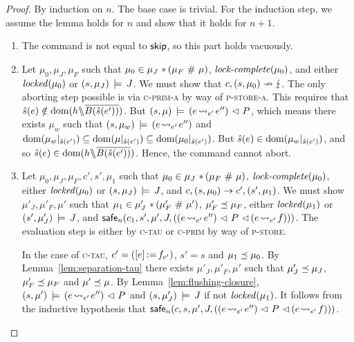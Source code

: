 \documentclass[11pt]{report}
\begin{document}
\begin{proof}
    By induction on $n$. The base case is trivial. For the induction step, we assume the lemma holds for $n$ and show that it holds for $n+1$.

    \begin{enumerate}
        \item The command is not equal to $\operatorname{\mathsf{skip}}$, so this part holds vacuously. 

        \item Let $\mu_0,\mu_J,\mu_F$ such that $\mu_0 \in \mu_J \operatorname{\,\ast\,} (\mu_F \operatorname{\,\#\,} \mu)$, $\text{\textit{lock-complete}}(\mu_0)$, and either $\mathit{locked}(\mu_0)$ or $(s,\mu_J) \,\models\, J$. We must show that $c,(s,\mu_0) \nrightarrow \lightning$. The only aborting step possible is via \textsc{c-prim-a} by way of \textsc{p-store-a}. This requires that $\hat{s}(e) \notin \operatorname{\mathrm{dom}}(h \backslash\!\!\backslash \overline{B(\hat{s}(e'))})$. But $(s,\mu) \,\models\, (e \!\leadsto_{e'}\! e'') \operatorname{\,\vartriangleleft\,} P$, which means there exists $\mu_w$ such that $(s,\mu_w) \,\models\, (e \!\leadsto_{e'}\! e'')$ and $\operatorname{\mathrm{dom}}(\mu_w |_{\hat{s}(e')}) \subseteq \operatorname{\mathrm{dom}}(\mu |_{\hat{s}(e')}) \subseteq \operatorname{\mathrm{dom}}(\mu_0 |_{\hat{s}(e')})$. But $\hat{s}(e) \in \operatorname{\mathrm{dom}}(\mu_w |_{\hat{s}(e')})$, and so $\hat{s}(e) \in \operatorname{\mathrm{dom}}(h \backslash\!\!\backslash \overline{B(\hat{s}(e'))})$. Hence, the command cannot abort.

        \item Let $\mu_0,\mu_J,\mu_F,c',s',\mu_1$ such that $\mu_0 \in \mu_J \operatorname{\,\ast\,} (\mu_F \operatorname{\,\#\,} \mu)$, $\text{\textit{lock-complete}}(\mu_0)$, either $\mathit{locked}(\mu_0)$ or $(s,\mu_J) \,\models\, J$, and $c,(s,\mu_0) \rightarrow c',(s',\mu_1)$. We must show $\mu'_J,\mu'_F,\mu'$ such that $\mu_1 \in \mu'_J \operatorname{\,\ast\,} (\mu'_F \operatorname{\,\#\,} \mu')$, $\mu'_F \preceq \mu_F$, either $\mathit{locked}(\mu_1)$ or $(s',\mu'_J) \,\models\, J$, and $\mathsf{safe}_{n}(c_1,s',\mu',J,\left((e \!\leadsto_{e'}\! e'') \operatorname{\,\vartriangleleft\,} P \operatorname{\,\vartriangleleft\,} (e \!\leadsto_{e'}\! f)\right))$. The evaluation step is either by \textsc{c-tau} or \textsc{c-prim} by way of \textsc{p-store}. 

        In the case of \textsc{c-tau}, $c' = (\left[ e \right] \operatorname{:\!=} f_{e'})$, $s' = s$ and $\mu_1 \preceq \mu_0$. By Lemma~\ref{lem:separation-tau} there exists $\mu'_J,\mu'_F,\mu'$ such that $\mu'_J \preceq \mu_J$, $\mu'_F \preceq \mu_F$ and $\mu' \preceq \mu$. By Lemma~\ref{lem:flushing-closure}, $(s,\mu') \,\models\, (e \!\leadsto_{e'}\! e'') \operatorname{\,\vartriangleleft\,} P$ and $(s,\mu'_J) \,\models\, J$ if not $\mathit{locked}(\mu_1)$. It follows from the inductive hypothesis that $\mathsf{safe}_{n}(c,s,\mu',J,((e \!\leadsto_{e'}\! e'') \operatorname{\,\vartriangleleft\,} P \operatorname{\,\vartriangleleft\,} (e \!\leadsto_{e'}\! f)))$. 


\end{enumerate}
\end{proof}
\end{document}
